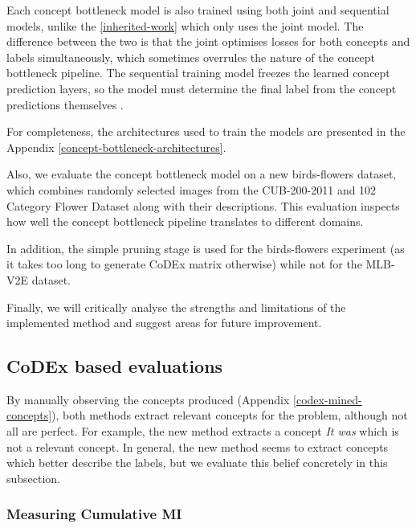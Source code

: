Each concept bottleneck model is also trained using both joint and sequential models, unlike the \ref{inherited-work} which only uses the joint model.
The difference between the two is that the joint optimises losses for both concepts and labels simultaneously, which sometimes overrules the nature of the concept bottleneck pipeline.
The sequential training model freezes the learned concept prediction layers, so the model must determine the final label from the concept predictions themselves \cite{RefWorks:RefID:68-margeloiu2021concept}.

For completeness, the architectures used to train the models are presented in the Appendix \ref{concept-bottleneck-architectures}.

Also, we evaluate the concept bottleneck model on a new birds-flowers dataset, which combines randomly selected images from the CUB-200-2011 \cite{RefWorks:RefID:69-wah2011caltech-ucsd} and 102 Category Flower Dataset \cite{RefWorks:RefID:70-nilsback2008automated} along with their descriptions.
This evaluation inspects how well the concept bottleneck pipeline translates to different domains.

In addition, the simple pruning stage is used for the birds-flowers experiment (as it takes too long to generate CoDEx matrix otherwise) while not for the MLB-V2E dataset.

Finally, we will critically analyse the strengths and limitations of the implemented method and suggest areas for future improvement.

\subsection{CoDEx based evaluations}

By manually observing the concepts produced (Appendix \ref{codex-mined-concepts}), both methods extract relevant concepts for the problem, although not all are perfect.
For example, the new method extracts a concept \emph{It was} which is not a relevant concept.
In general, the new method seems to extract concepts which better describe the labels, but we evaluate this belief concretely in this subsection.


\subsubsection{Measuring Cumulative MI}

